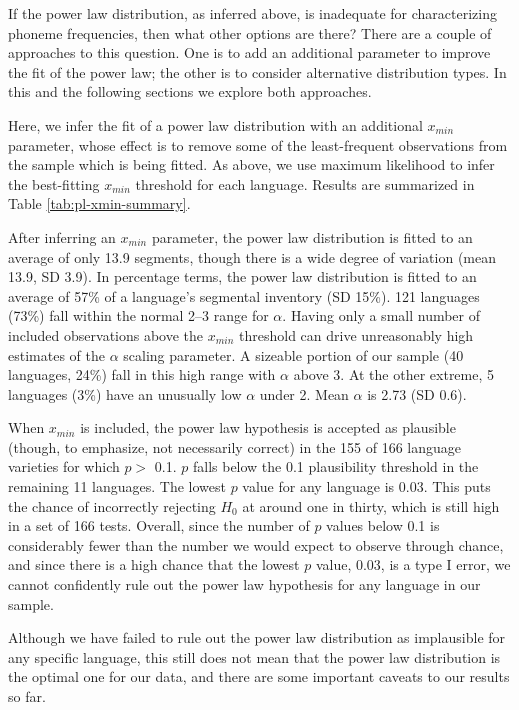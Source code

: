 If the power law distribution, as inferred above, is inadequate for characterizing phoneme frequencies, then what other options are there? There are a couple of approaches to this question. One is to add an additional parameter to improve the fit of the power law; the other is to consider alternative distribution types. In this and the following sections we explore both approaches.

Here, we infer the fit of a power law distribution with an additional \(x_{min}\) parameter, whose effect is to remove some of the least-frequent observations from the sample which is being fitted. As above, we use maximum likelihood to infer the best-fitting \(x_{min}\) threshold for each language. Results are summarized in Table \ref{tab:pl-xmin-summary}.

After inferring an \(x_{min}\) parameter, the power law distribution is fitted to an average of only 13.9 segments, though there is a wide degree of variation (mean 13.9, SD 3.9). In percentage terms, the power law distribution is fitted to an average of 57\% of a language's segmental inventory (SD 15\%). 121 languages (73\%) fall within the normal 2--3 range for \(\alpha\). Having only a small number of included observations above the \(x_{min}\) threshold can drive unreasonably high estimates of the \(\alpha\) scaling parameter. A sizeable portion of our sample (40 languages, 24\%) fall in this high range with \(\alpha\) above 3. At the other extreme, 5 languages (3\%) have an unusually low \(\alpha\) under 2. Mean \(\alpha\) is 2.73 (SD 0.6).

When \(x_{min}\) is included, the power law hypothesis is accepted as plausible (though, to emphasize, not necessarily correct) in the 155 of 166 language varieties for which \(p >\) 0.1. \(p\) falls below the 0.1 plausibility threshold in the remaining 11 languages. The lowest \(p\) value for any language is 0.03. This puts the chance of incorrectly rejecting \(H_0\) at around one in thirty, which is still high in a set of 166 tests. Overall, since the number of \(p\) values below 0.1 is considerably fewer than the number we would expect to observe through chance, and since there is a high chance that the lowest \(p\) value, 0.03, is a type I error, we cannot confidently rule out the power law hypothesis for any language in our sample.

Although we have failed to rule out the power law distribution as implausible for any specific language, this still does not mean that the power law distribution is the optimal one for our data, and there are some important caveats to our results so far.


